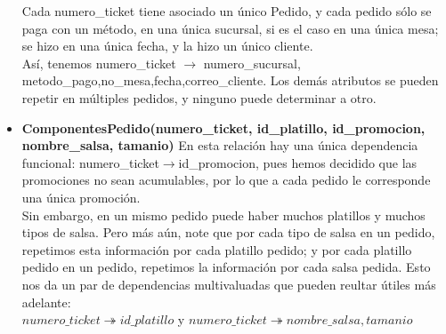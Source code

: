 \documentclass[11pt]{article}
\begin{document}
\begin{itemize}
Cada numero\_ticket tiene asociado un único Pedido, y cada pedido sólo se paga con un método, en una única sucursal, si es el caso en una única mesa; se hizo en una única fecha, y la hizo un único cliente. \\Así, tenemos numero\_ticket $\rightarrow$ numero\_sucursal, metodo\_pago,no\_mesa,fecha,correo\_cliente. Los demás atributos se pueden repetir en múltiples pedidos, y ninguno puede determinar a otro. 
\item \textbf{ComponentesPedido(numero\_ticket, id\_platillo, id\_promocion, nombre\_salsa, tamanio)}
En esta relación hay una única dependencia funcional: numero\_ticket$\rightarrow$id\_promocion, pues hemos decidido que las promociones no sean acumulables, por lo que a cada pedido le corresponde una única promoción. \\
Sin embargo, en un mismo pedido puede haber muchos platillos y muchos tipos de salsa. Pero más aún, note que por cada tipo de salsa en un pedido, repetimos esta información por cada platillo pedido; y por cada platillo pedido en un pedido, repetimos la información por cada salsa pedida. Esto nos da un par de dependencias multivaluadas que pueden reultar útiles más adelante:\\
$numero\_ticket \twoheadrightarrow id\_platillo$ y $numero\_ticket \twoheadrightarrow nombre\_salsa,tamanio$ 
\end{itemize}
\end{document}
